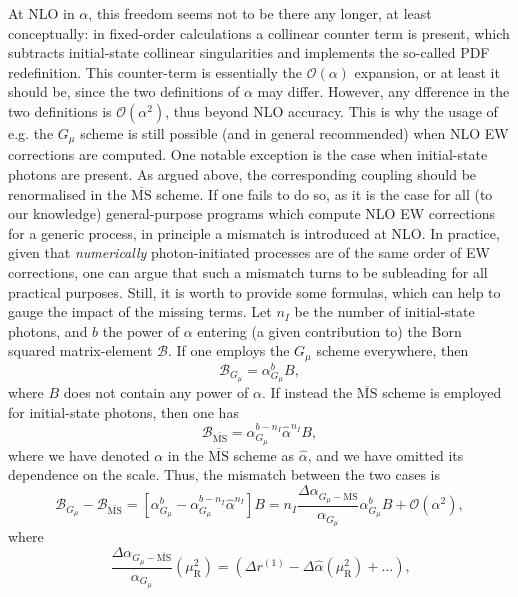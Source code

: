 At NLO in $\alpha$, this freedom seems not to be there any longer, at least conceptually: in fixed-order calculations a collinear counter term is present,
which subtracts initial-state collinear singularities and implements the so-called PDF redefinition. This counter-term is
essentially the $\mathcal O(\alpha)$ expansion, or at least it should be, since the two definitions of $\alpha$ may differ. However, any
dfference in the two definitions is $\mathcal O(\alpha^2)$, thus beyond NLO accuracy. This is why the usage of e.g. the $G_\mu$ scheme
is still possible (and in general recommended) when NLO EW corrections are computed. One notable exception
is the case when initial-state photons are present. As argued above, the corresponding coupling should be renormalised in the $\overline{\textrm{MS}}$ scheme.
If one fails to do so, as it is the case for all (to our knowledge) general-purpose programs which compute NLO EW corrections for a generic process, in
principle a mismatch is introduced at NLO. In practice, given that \emph{numerically} photon-initiated processes are of the same order of EW corrections,
one can argue that such a mismatch turns to be subleading for all practical purposes. Still, it is worth to provide some formulas, which can help to gauge the impact of the missing terms.
Let $n_I$ be the number of initial-state photons, and $b$ the power of $\alpha$ entering (a given contribution to) the Born squared matrix-element $\mathcal B$. If
one employs the $G_\mu$ scheme everywhere, then
\begin{equation}
    \mathcal B_{G_\mu}= \alpha_{G_\mu}^b B,
\end{equation}
where $B$ does not contain any power of $\alpha$. If instead the $\overline{\textrm{MS}}$ scheme is employed for initial-state photons, then one has
\begin{equation}
    \mathcal B_{\overline{\textrm{MS}}}= \alpha_{G_\mu}^{b-n_I} \hat \alpha^{n_I} B,
\end{equation}
where we have denoted $\alpha$ in the $\overline{\textrm{MS}}$ scheme as $\hat\alpha$, and we have omitted its dependence on the scale.
Thus, the mismatch between the two cases is
\begin{equation}
    \mathcal B_{G_\mu} - \mathcal B_{\overline{\textrm{MS}}}  = \left[ \alpha_{G_\mu}^b - \alpha_{G_\mu}^{b-n_I} \hat \alpha^{n_I} \right] B =
    n_I \frac{\Delta \alpha_{G_\mu-\overline{\textrm{MS}}}}{\alpha_{G_\mu}} \alpha_{G_\mu}^b B  + \mathcal O (\alpha^2),
\end{equation}
where
\begin{equation}
\frac{\Delta \alpha_{G_\mu-\overline{\textrm{MS}}}}{\alpha_{G_\mu}}(\mu_\mathrm{R}^2) = 
\left(\Delta r^{(1)} - \Delta \hat{\alpha} (\mu_\mathrm{R}^2) + \ldots \right) \text{,} \label{eq:consistency-condition}
\end{equation}
